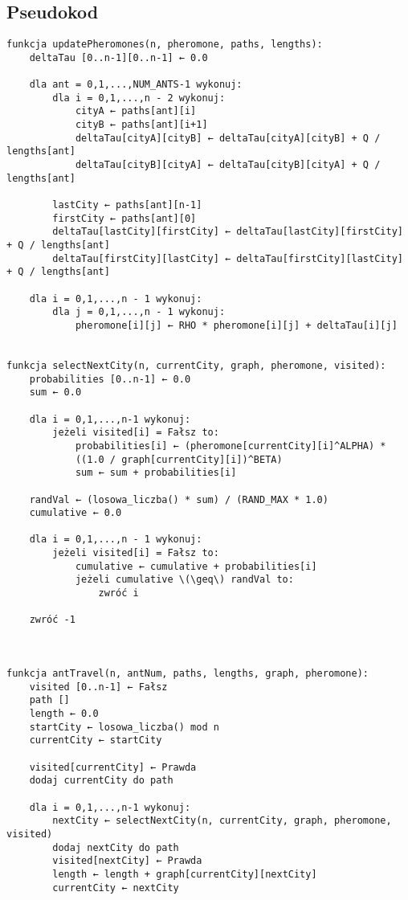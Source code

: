 \documentclass{article}
\begin{document}
\subsection{Pseudokod}

\begin{Verbatim}[commandchars=\\\{\}]
funkcja updatePheromones(n, pheromone, paths, lengths):
	deltaTau [0..n-1][0..n-1] ← 0.0
	
	dla ant = 0,1,...,NUM_ANTS-1 wykonuj:
	    dla i = 0,1,...,n - 2 wykonuj:
	        cityA ← paths[ant][i]
	        cityB ← paths[ant][i+1]
	        deltaTau[cityA][cityB] ← deltaTau[cityA][cityB] + Q / lengths[ant]
	        deltaTau[cityB][cityA] ← deltaTau[cityB][cityA] + Q / lengths[ant]
	
	    lastCity ← paths[ant][n-1]
	    firstCity ← paths[ant][0]
	    deltaTau[lastCity][firstCity] ← deltaTau[lastCity][firstCity] + Q / lengths[ant]
	    deltaTau[firstCity][lastCity] ← deltaTau[firstCity][lastCity] + Q / lengths[ant]
	
	dla i = 0,1,...,n - 1 wykonuj:
	    dla j = 0,1,...,n - 1 wykonuj:
	        pheromone[i][j] ← RHO * pheromone[i][j] + deltaTau[i][j]
	            
	            
funkcja selectNextCity(n, currentCity, graph, pheromone, visited):
    probabilities [0..n-1] ← 0.0
    sum ← 0.0
    
    dla i = 0,1,...,n-1 wykonuj:
        jeżeli visited[i] = Fałsz to:
            probabilities[i] ← (pheromone[currentCity][i]^ALPHA) *
            ((1.0 / graph[currentCity][i])^BETA)
            sum ← sum + probabilities[i]
    
    randVal ← (losowa_liczba() * sum) / (RAND_MAX * 1.0)
    cumulative ← 0.0
    
    dla i = 0,1,...,n - 1 wykonuj:
        jeżeli visited[i] = Fałsz to:
            cumulative ← cumulative + probabilities[i]
            jeżeli cumulative \(\geq\) randVal to:
                zwróć i
    
    zwróć -1 
    
    
    
funkcja antTravel(n, antNum, paths, lengths, graph, pheromone):
    visited [0..n-1] ← Fałsz
    path []
    length ← 0.0
    startCity ← losowa_liczba() mod n
    currentCity ← startCity
    
    visited[currentCity] ← Prawda
    dodaj currentCity do path
    
    dla i = 0,1,...,n-1 wykonuj:
        nextCity ← selectNextCity(n, currentCity, graph, pheromone, visited)
        dodaj nextCity do path
        visited[nextCity] ← Prawda
        length ← length + graph[currentCity][nextCity]
        currentCity ← nextCity
    

\end{Verbatim}
\end{document}
